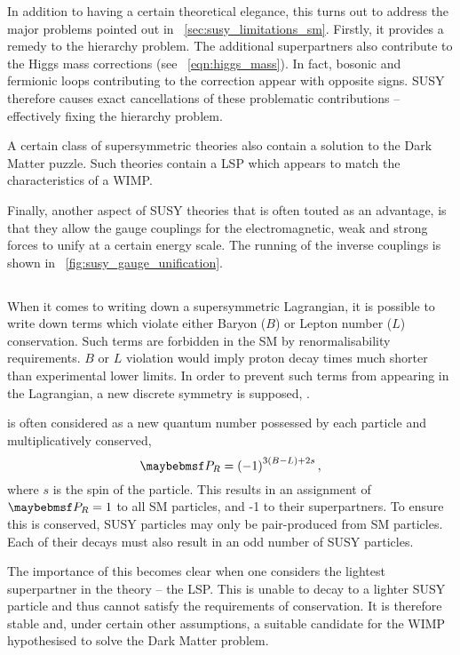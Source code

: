 In addition to having a certain theoretical elegance, this turns out to address
the major problems pointed out in \sec~\ref{sec:susy_limitations_sm}. Firstly,
it provides a remedy to the hierarchy problem. The additional superpartners also
contribute to the Higgs mass corrections (see \eqn~\ref{eqn:higgs_mass}). In
fact, bosonic and fermionic loops contributing to the correction appear with
opposite signs. \acl{SUSY} therefore causes exact cancellations of these
problematic contributions -- effectively fixing the hierarchy problem.

A certain class of supersymmetric theories also contain a solution to the Dark
Matter puzzle. Such theories contain a \acf{LSP} which appears to match the
characteristics of a \ac{WIMP}.

Finally, another aspect of \ac{SUSY} theories that is often touted as an
advantage, is that they allow the gauge couplings for the electromagnetic, weak
and strong forces to unify at a certain energy scale. The running of the inverse
couplings is shown in \fig~\ref{fig:susy_gauge_unification}.

\subsection[R-Parity]{\Rparity}
When it comes to writing down a supersymmetric Lagrangian, it is possible to
write down terms which violate either Baryon ($B$) or Lepton number ($L$)
conservation. Such terms are forbidden in the \ac{SM} by renormalisability
requirements. $B$ or $L$ violation would imply proton decay times much shorter
than experimental lower limits. In order to prevent such terms from appearing in
the Lagrangian, a new discrete symmetry is supposed, \Rparity.

\Rparity is often considered as a new quantum number possessed by each particle
and multiplicatively conserved,
\begin{equation*}
\PR = \left(-1\right)^{3(B-L)+2s},
\end{equation*}
where $s$ is the spin of the particle. This results in an assignment of $\PR =
1$ to all \ac{SM} particles, and -1 to their superpartners. To ensure this is
conserved, \ac{SUSY} particles may only be pair-produced from \ac{SM}
particles. Each of their decays must also result in an odd number of \ac{SUSY}
particles.

The importance of this becomes clear when one considers the lightest
superpartner in the theory -- the \ac{LSP}. This is unable to decay to a lighter
\ac{SUSY} particle and thus cannot satisfy the requirements of \Rparity
conservation. It is therefore stable and, under certain other assumptions, a
suitable candidate for the \ac{WIMP} hypothesised to solve the Dark Matter
problem.

